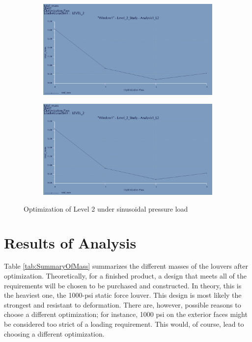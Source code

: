 \documentclass[12pt,letterpaper]{report}
\begin{document}
		\begin{figure}[H]
			\centering
			\begin{subfigure}{.45\textwidth}
				\includegraphics[width=\textwidth]{SinusoidalL2OptimMass}
				\label{fig:L2SinusoidalOptimDispGraph}
			\end{subfigure}
			\begin{subfigure}{.45\textwidth}
				\includegraphics[width=\textwidth]{SinusoidalL2OptimMass}
				\label{fig:L2SinusoidalOptimMassGraph}
			\end{subfigure}
			\caption{Optimization of Level 2 under sinusoidal pressure load}
		\end{figure}
		\graphicspath{ {..} }
		
		
		
		\section{Results of Analysis}
		Table \ref{tab:SummaryOfMass} summarizes the different masses of the louvers after optimization.  Theoretically, for a finished product, a design that meets all of the requirements will be chosen to be purchased and constructed.  In theory, this is the heaviest one, the 1000-psi static force louver.  This design is most likely the strongest and resistant to deformation.  There are, however, possible reasons to choose a different optimization; for instance, 1000 psi on the exterior faces might be considered too strict of a loading requirement.  This would, of course, lead to choosing a different optimization.
		
\end{document}
